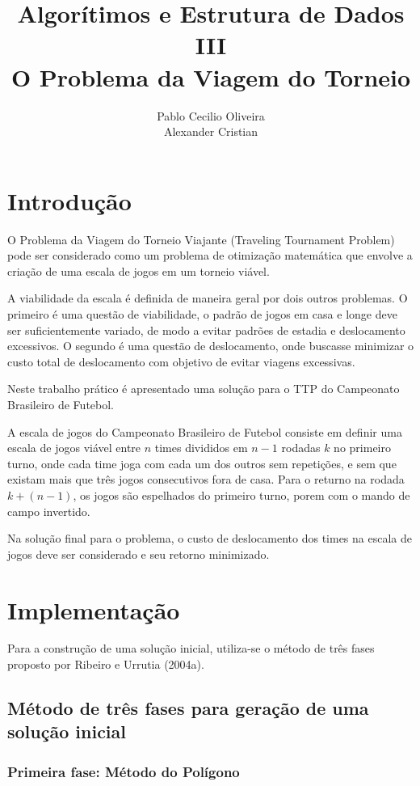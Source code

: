 \documentclass[12pt,a4paper]{article}
\author{Pablo Cecilio Oliveira\\
	Alexander Cristian}
\title{Algorítimos e Estrutura de Dados III\\
O Problema da Viagem do Torneio}
\date{}
\begin{document}
\maketitle

\section{Introdução}

O Problema da Viagem do Torneio Viajante (Traveling Tournament Problem) pode ser considerado como um problema de otimização matemática que envolve a criação de uma escala de jogos em um torneio viável.

A viabilidade da escala é definida de maneira geral por dois  outros problemas. O primeiro é uma questão de viabilidade, o padrão de jogos em casa e longe deve ser suficientemente variado, de modo a evitar padrões de estadia e deslocamento excessivos. O segundo é uma questão de deslocamento, onde buscasse minimizar o custo total de deslocamento com objetivo de evitar viagens excessivas.

Neste trabalho prático é apresentado uma solução para o TTP do Campeonato Brasileiro de Futebol.

A escala de jogos do Campeonato Brasileiro de Futebol consiste em definir uma escala de jogos viável entre $n$ times divididos em $n-1$ rodadas $k$ no primeiro turno, onde cada time joga com cada um dos outros sem repetições, e sem que existam mais que três jogos consecutivos fora de casa. Para o returno na rodada $k + (n - 1)$, os jogos são espelhados do primeiro turno, porem com o mando de campo invertido.

Na solução final para o problema, o custo de deslocamento dos times na escala de jogos deve ser considerado e seu retorno minimizado.

\section{Implementação}

Para a construção de uma solução inicial, utiliza-se o método de três fases proposto por Ribeiro e Urrutia (2004a)\cite{urrutia:heuristics}.

\subsection{Método de três fases para geração de uma solução inicial}

\subsubsection{Primeira fase: Método do Polígono}
\end{document}
